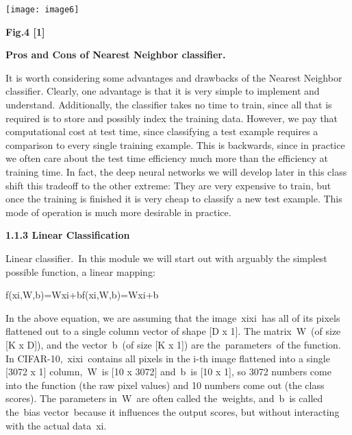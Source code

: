 \documentclass{article} %
\begin{document}
\noindent 

\noindent 

\noindent \texttt{[image: image6]}

\noindent \textbf{Fig.4  [1]}

\noindent \textbf{Pros and Cons of Nearest Neighbor classifier.}

\noindent It is worth considering some advantages and drawbacks of the Nearest Neighbor classifier. Clearly, one advantage is that it is very simple to implement and understand. Additionally, the classifier takes no time to train, since all that is required is to store and possibly index the training data. However, we pay that computational cost at test time, since classifying a test example requires a comparison to every single training example. This is backwards, since in practice we often care about the test time efficiency much more than the efficiency at training time. In fact, the deep neural networks we will develop later in this class shift this tradeoff to the other extreme: They are very expensive to train, but once the training is finished it is very cheap to classify a new test example. This mode of operation is much more desirable in practice.

\noindent 

\noindent \textbf{1.1.3 Linear Classification }

\noindent Linear classifier.~In this module we will start out with arguably the simplest possible function, a linear mapping:

\noindent                                                 f(xi,W,b)=Wxi+bf(xi,W,b)=Wxi+b

\noindent 

\noindent                        In the above equation, we are assuming that the image~xixi~has all of its pixels flattened out to a single column vector of shape [D x 1]. The matrix~W~(of size [K x D]), and the vector~b~(of size [K x 1]) are the~parameters~of the function. In CIFAR-10,~xixi~contains all pixels in the i-th image flattened into a single [3072 x 1] column,~W~is [10 x 3072] and~b~is [10 x 1], so 3072 numbers come into the function (the raw pixel values) and 10 numbers come out (the class scores). The parameters in~W~are often called the~weights, and~b~is called the~bias vector~because it influences the output scores, but without interacting with the actual data~xi.

\noindent                       
\end{document}

